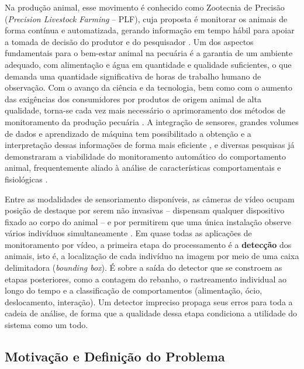 \documentclass[12pt]{article}
\begin{document}
Na produção animal, esse movimento é conhecido como Zootecnia de Precisão (\textit{Precision Livestock Farming} -- PLF), cuja proposta é monitorar os animais de forma contínua e automatizada, gerando informação em tempo hábil para apoiar a tomada de decisão do produtor e do pesquisador \cite{berckmans2014plf}. Um dos aspectos fundamentais para o bem-estar animal na pecuária é a garantia de um ambiente adequado, com alimentação e água em quantidade e qualidade suficientes, o que demanda uma quantidade significativa de horas de trabalho humano de observação. Com o avanço da ciência e da tecnologia, bem como com o aumento das exigências dos consumidores por produtos de origem animal de alta qualidade, torna-se cada vez mais necessário o aprimoramento dos métodos de monitoramento da produção pecuária \cite{dominiak2019, nasirahmadi2017, halachmi2019}. A integração de sensores, grandes volumes de dados e aprendizado de máquina tem possibilitado a obtenção e a interpretação dessas informações de forma mais eficiente \cite{neethirajan2020sensors}, e diversas pesquisas já demonstraram a viabilidade do monitoramento automático do comportamento animal, frequentemente aliado à análise de características comportamentais e fisiológicas \cite{halachmi2019, fogarty2018, rohan2023deep_livestock_survey}.

Entre as modalidades de sensoriamento disponíveis, as câmeras de vídeo ocupam posição de destaque por serem não invasivas -- dispensam qualquer dispositivo fixado ao corpo do animal -- e por permitirem que uma única instalação observe vários indivíduos simultaneamente \cite{nasirahmadi2017}. Em quase todas as aplicações de monitoramento por vídeo, a primeira etapa do processamento é a \textbf{detecção} dos animais, isto é, a localização de cada indivíduo na imagem por meio de uma caixa delimitadora (\textit{bounding box}). É sobre a saída do detector que se constroem as etapas posteriores, como a contagem do rebanho, o rastreamento individual ao longo do tempo e a classificação de comportamentos (alimentação, ócio, deslocamento, interação). Um detector impreciso propaga seus erros para toda a cadeia de análise, de forma que a qualidade dessa etapa condiciona a utilidade do sistema como um todo.

\subsection{Motivação e Definição do Problema}
\label{subsec:motivacao}
\end{document}
